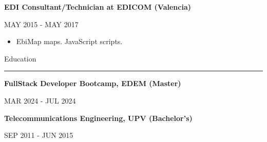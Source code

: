 \documentclass{letter}
\begin{document}
\begin{minipage}[t]{0.60\textwidth}
{\large \textbf{EDI Consultant/Technician at EDICOM (Valencia)}}

{\small MAY 2015 - MAY 2017}
\begin{itemize}
    \item EbiMap maps. JavaScript scripts.
\end{itemize}

{\large Education}
\rule{\linewidth}{0.4pt}

{\large \textbf{FullStack Developer Bootcamp, EDEM (Master)}}

{\small MAR 2024 - JUL 2024}

{\large \textbf{Telecommunications Engineering, UPV (Bachelor's)}}

{\small SEP 2011 - JUN 2015}

\end{minipage}
\end{document}
